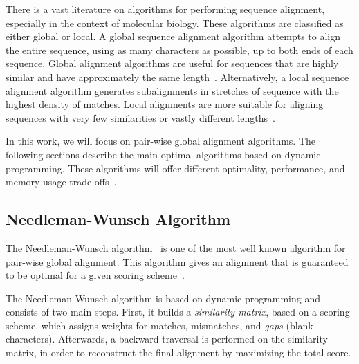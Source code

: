 There is a vast literature on algorithms for performing sequence alignment, especially in the context of molecular biology.
These algorithms are classified as either global or local.
A global sequence alignment algorithm attempts to align the entire sequence, using as many characters as possible, up to both ends of each sequence.
Global alignment algorithms are useful for sequences that are highly similar and have approximately the same length~\cite{mount05book}.
Alternatively, a local sequence alignment algorithm generates subalignments in stretches of sequence with the highest density of matches.
Local alignments are more suitable for aligning sequences with very few similarities or vastly different lengths~\cite{mount05book}.

In this work, we will focus on pair-wise global alignment algorithms.
The following sections describe the main optimal algorithms based on dynamic programming.
These algorithms will offer different optimality, performance, and memory usage trade-offs~\cite{needleman70,smith81,carrillo88,hickey11}.

\subsection{Needleman-Wunsch Algorithm}

The Needleman-Wunsch algorithm~\cite{needleman70} is one of the most well known algorithm for pair-wise global alignment.
This algorithm gives an alignment that is guaranteed to be optimal for a given scoring scheme~\cite{higgins89}.

The Needleman-Wunsch algorithm is based on dynamic programming and consists of two main steps.
First, it builds a \textit{similarity matrix}, based on a scoring scheme, which assigns weights for matches, mismatches, and \textit{gaps} (blank characters).
Afterwards, a backward traversal is performed on the similarity matrix, in order to reconstruct the final alignment by maximizing the total score.

